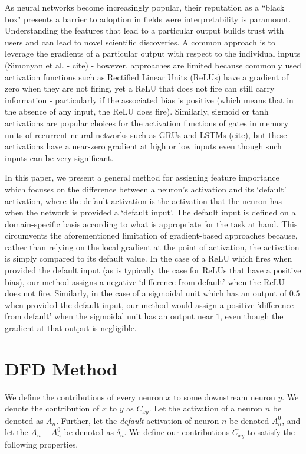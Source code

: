 \documentclass{article}
\begin{document}
As neural networks become increasingly popular, their reputation as a ``black box" presents a barrier to adoption in fields were interpretability is paramount. Understanding the features that lead to a particular output builds trust with users and can lead to novel scientific discoveries. A common approach is to leverage the gradients of a particular output with respect to the individual inputs (Simonyan et al. - cite) - however, approaches are limited because commonly used activation functions such as Rectified Linear Units (ReLUs) have a gradient of zero when they are not firing, yet a ReLU that does not fire can still carry information - particularly if the associated bias is positive (which means that in the absence of any input, the ReLU does fire). Similarly, sigmoid or tanh activations are popular choices for the activation functions of gates in memory units of recurrent neural networks such as GRUs and LSTMs (cite), but these activations have a near-zero gradient at high or low inputs even though such inputs can be very significant.

In this paper, we present a general method for assigning feature importance which focuses on the difference between a neuron's activation and its `default' activation, where the default activation is the activation that the neuron has when the network is provided a `default input'. The default input is defined on a domain-specific basis according to what is appropriate for the task at hand. This circumvents the aforementioned limitation of gradient-based approaches because, rather than relying on the local gradient at the point of activation, the activation is simply compared to its default value. In the case of a ReLU which fires when provided the default input (as is typically the case for ReLUs that have a positive bias), our method assigns a negative `difference from default' when the ReLU does not fire. Similarly, in the case of a sigmoidal unit which has an output of $0.5$ when provided the default input, our method would assign a positive `difference from default' when the sigmoidal unit has an output near $1$, even though the gradient at that output is negligible.

\section{DFD Method}
\label{DFD}

We define the contributions of every neuron $x$ to some downstream neuron $y$. We denote the contribution of $x$ to $y$ as $C_{xy}$. Let the activation of a neuron $n$ be denoted as $A_n$. Further, let the \emph{default} activation of neuron $n$ be denoted $A_n^0$, and let the $A_n - A_n^0$ be denoted as $\delta_n$. We define our contributions $C_{xy}$ to satisfy the following properties.
\end{document}
